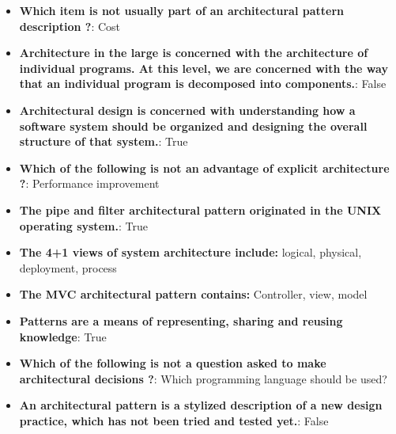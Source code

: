\documentclass{report}
\begin{document}
    \pagebreak 
    \begin{itemize}
        \item \textbf{Which item is not usually part of an architectural pattern description ?}: Cost
        \item \textbf{Architecture in the large is concerned with the architecture of individual programs. At this level, we are concerned with the way that an individual program is decomposed into components.}: False
        \item \textbf{Architectural design is concerned with understanding how a software system should be organized and designing the overall structure of that system.}: True
        \item \textbf{Which of the following is not an advantage of explicit architecture ?}: Performance improvement
        \item \textbf{The pipe and filter architectural pattern originated in the UNIX operating system.}: True
        \item \textbf{The 4+1 views of system architecture include:} logical, physical, deployment, process
        \item \textbf{The MVC architectural pattern contains:} Controller, view, model
        \item \textbf{Patterns are a means of representing, sharing and reusing knowledge}: True
        \item \textbf{Which of the following is not a question asked to make architectural decisions ?}: Which programming language should be used?
        \item \textbf{An architectural pattern is a stylized description of a new design practice, which has not been tried and tested yet.}: False
    \end{itemize}
    
\end{document}
